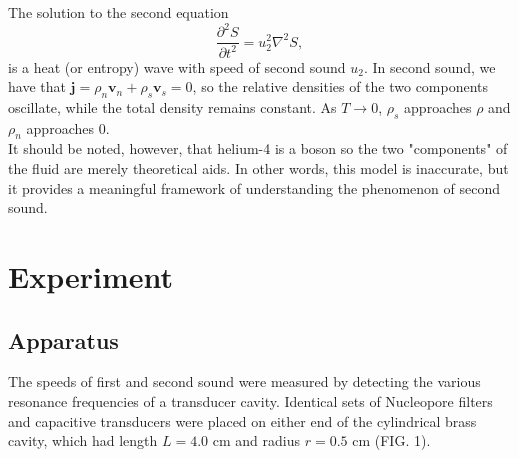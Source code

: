 \documentclass[prb,aps,twocolumn,showpacs,10pt]{revtex4-1}
\begin{document}
The solution to the second equation
\begin{equation}
\frac{\partial^2S}{\partial t^2} = u_2^2 \nabla^2 S,
\end{equation}
is a heat (or entropy) wave with speed of second sound $u_2$. In second sound, we have that $\mathbf{j}=\rho_n \mathbf{v}_n+\rho_s \mathbf{v}_s=0$, so the relative densities of the two components oscillate, while the total density remains constant\cite{stanford}. As $T\rightarrow 0$, $\rho_s$ approaches $\rho$ and $\rho_n$ approaches 0. \\

It should be noted, however, that helium-4  is a boson so the two "components" of the fluid are merely theoretical aids. In other words, this model is inaccurate, but it provides a meaningful framework of understanding the phenomenon of second sound. \\

\section{Experiment}

\subsection{Apparatus}
The speeds of first and second sound were measured by detecting the various resonance frequencies of a transducer cavity. Identical sets of Nucleopore filters and capacitive transducers were placed on either end of the cylindrical brass cavity, which had length $L=4.0$ cm and radius $r = 0.5$ cm (FIG. 1).\\
\end{document}
